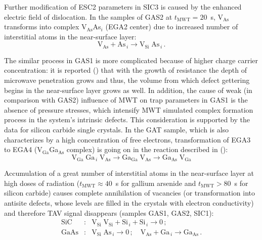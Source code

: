 \documentclass[final,3p,times,twocolumn,authoryear]{elsarticle}
\begin{document}
Further modification of ESC2 parameters in SIC3 is caused by the enhanced electric field of dislocation.
In the samples of GAS2 at $t_\mathrm{MWT}=20$~s,
V$_\mathrm{As}$ transforms into complex V$_\mathrm{As}$As$_i$ 
(EGA2 center)
due to increased number of interstitial atoms in the near-surface layer:
\begin{displaymath}
\mathrm{V}_\mathrm{As}+ \mathrm{As}_{\,i} \rightarrow \mathrm{V}_\mathrm{Si}\;\mathrm{As}_{\,i}\,.
\end{displaymath}

The similar process in GAS1 is more complicated because of higher charge carrier concentration:
it is reported (\cite{ZOHM2000}) that with the growth of resistance the depth of microwave penetration grows
and thus, the volume from which defect gettering begins in the near-surface layer grows as well.
In addition, the cause of weak (in comparison with GAS2) influence of MWT on trap parameters in GAS1 is the absence of pressure stresses,
which intensify MWT simulated complex formation process in the system’s intrinsic defects.
This consideration is supported by the data for silicon carbide single crystals. 
In the GAT sample, which is also characterizes by a high concentration of free electrons,
transformation of EGA3 to EGA4 (V$_\mathrm{Ga}$Ga$_\mathrm{As}$ complex) is going on in the reaction described in (\cite{FANG1990}):
\begin{displaymath}
  \mathrm{V}_\mathrm{Ga}\;\mathrm{Ga}_{\,i}\;\mathrm{V}_\mathrm{As}\rightarrow \mathrm{Ga}_\mathrm{Ga}\;\mathrm{V}_\mathrm{As}
  \rightarrow \mathrm{Ga}_\mathrm{As}\;\mathrm{V}_\mathrm{Ga}
\end{displaymath}


Accumulation of a great number of interstitial atoms in the near-surface layer at high doses of radiation
($t_\mathrm{MWT}\approx40$~s for gallium arsenide and $t_\mathrm{MWT}>80$~s for silicon carbide)
causes complete annihilation of vacancies (or transformation into antisite defects, whose levels are filled in the crystals with electron conductivity)
 and therefore TAV signal disappears (samples GAS1, GAS2, SIC1):
\begin{eqnarray}
  \nonumber
  \mathrm{SiC}&:&\mathrm{V}_\mathrm{Si}\;\mathrm{V}_\mathrm{Si}+\mathrm{Si}_{\,i}+ \mathrm{Si}_{\,i} \rightarrow 0\,;\\
  \nonumber
  \mathrm{GaAs}&:&\mathrm{V}_\mathrm{Si}\;\mathrm{As}_{\,i} \rightarrow 0\,;\quad
  \mathrm{V}_\mathrm{As}+\mathrm{Ga}_{\,i} \rightarrow \mathrm{Ga}_\mathrm{As}\,.
\end{eqnarray}
\end{document}
